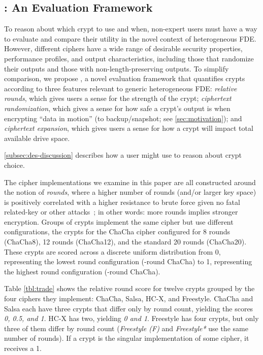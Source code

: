 \subsection{\sysC: An Evaluation Framework}\label{subsec:des-trade}

To reason about which crypt to use and when, non-expert users must have a way to
evaluate and compare their utility in the novel context of heterogeneous FDE.
However, different ciphers have a wide range of desirable security properties,
performance profiles, and output characteristics, including those that randomize
their outputs and those with non-length-preserving outputs. To simplify
comparison, we propose \sysC, a novel evaluation framework that quantifies
crypts according to three features relevant to generic heterogeneous FDE: {\em
relative rounds}, which gives users a sense for the strength of the crypt; {\em
ciphertext randomization}, which gives a sense for how safe a crypt's output is
when encrypting ``data in motion'' (\eg to backup/snapshot; see
\cref{sec:motivation}); and {\em ciphertext expansion}, which gives users a
sense for how a crypt will impact total available drive space.

\cref{subsec:des-discussion} describes how a user might use \sysC to reason
about crypt choice.




 The cipher implementations we examine in this
paper are all constructed around the notion of {\em rounds}, where a higher
number of rounds (and/or larger key space) is positively correlated with a
higher resistance to brute force given no fatal related-key or other
attacks~\cite{ChaCha-Cryptanalysis}; in other words: more rounds implies
stronger encryption. Groups of crypts implement the same cipher but use
different configurations, \eg the crypts for the ChaCha cipher configured for 8
rounds (ChaCha8), 12 rounds (ChaCha12), and the standard 20 rounds (ChaCha20).
These crypts are scored across a discrete uniform distribution from 0,
representing the lowest round configuration (-round ChaCha) to 1,
representing the highest round configuration (-round ChaCha).

Table \cref{tbl:trade} shows the relative round score for twelve crypts grouped
by the four ciphers they implement: ChaCha, Salsa, HC-X, and Freestyle. ChaCha
and Salsa each have three crypts that differ only by round count, yielding the
scores {\em 0, 0.5, and 1}. HC-X has two, yielding {\em 0 and 1}. Freestyle has
four crypts, but only three of them differ by round count ({\em Freestyle (F)}
and {\em Freestyle*} use the same number of rounds). If a crypt is the singular
implementation of some cipher, it receives a 1.

